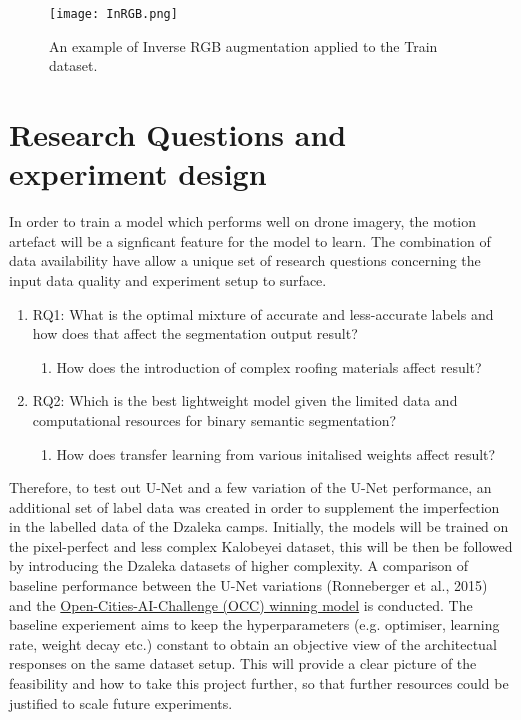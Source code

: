 \documentclass[11pt, a4paper, twoside]{report}
\begin{document}
\begin{figure}[H]
  \centering
  \texttt{[image: InRGB.png]}
  \caption{An example of Inverse RGB augmentation applied to the Train dataset.}
  \label{fig:InRGB}
\end{figure}


\section{Research Questions and experiment design}\label{RQ}

In order to train a model which performs well on drone imagery, the motion artefact will be a signficant feature for the model to learn. The combination of data availability have allow a unique set of research questions concerning the input data quality and experiment setup to surface.\\\par

\begin{enumerate}
  \item RQ1: What is the optimal mixture of accurate and less-accurate labels and how does that affect the segmentation output result?
    \begin{enumerate}
      \item How does the introduction of complex roofing materials affect result?
    \end{enumerate}
  \item RQ2: Which is the best lightweight model given the limited data and computational resources for binary semantic segmentation?
    \begin{enumerate}
      \item How does transfer learning from various initalised weights affect result?
    \end{enumerate}
\end{enumerate}

Therefore, to test out U-Net and a few variation of the U-Net performance, an additional set of label data was created in order to supplement the imperfection in the labelled data of the Dzaleka camps. Initially, the models will be trained on the pixel-perfect and less complex Kalobeyei dataset, this will be then be followed by introducing the Dzaleka datasets of higher complexity. A comparison of baseline performance between the U-Net variations (Ronneberger et al., 2015) and the \href{https://github.com/drivendataorg/open-cities-ai-challenge/tree/master/1st\%20Place}{Open-Cities-AI-Challenge (OCC) winning model} is conducted. The baseline experiement aims to keep the hyperparameters (e.g. optimiser, learning rate, weight decay etc.) constant to obtain an objective view of the architectual responses on the same dataset setup. This will provide a clear picture of the feasibility and how to take this project further, so that further resources could be justified to scale future experiments.\\\par
\end{document}

